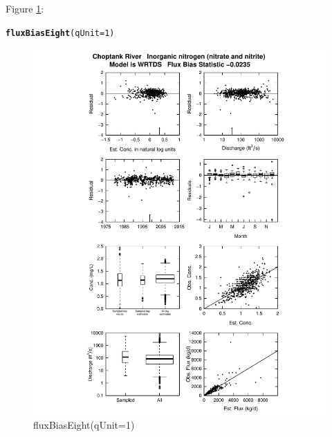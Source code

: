 \documentclass[a4paper,11pt]{article}\usepackage{graphicx, color}
\makeatletter
\def\maxwidth{ %
  \ifdim\Gin@nat@width>\linewidth
    \linewidth
  \else
    \Gin@nat@width
  \fi
}
\newcommand{\hlfunctioncall}[1]{\textcolor[rgb]{0.501960784313725,0,0.329411764705882}{\textbf{#1}}}%
\newenvironment{kframe}{%
 \def\at@end@of@kframe{}%
 \ifinner\ifhmode%
  \def\at@end@of@kframe{\end{minipage}}%
  \begin{minipage}{\columnwidth}%
 \fi\fi%
 \def\FrameCommand##1{\hskip\@totalleftmargin \hskip-\fboxsep
 \colorbox{shadecolor}{##1}\hskip-\fboxsep
     \hskip-\linewidth \hskip-\@totalleftmargin \hskip\columnwidth}%
 \MakeFramed {\advance\hsize-\width
   \@totalleftmargin\z@ \linewidth\hsize
   \@setminipage}}%
 {\par\unskip\endMakeFramed%
 \at@end@of@kframe}
\newenvironment{knitrout}{}{} %
\makeatother
\begin{document}
Figure \ref{fig:fluxBiasEight}:
\begin{knitrout}
\color{fgcolor}\begin{kframe}
\begin{alltt}
\hlfunctioncall{fluxBiasEight}(qUnit=1)
\end{alltt}
\end{kframe}\begin{figure}[]

\includegraphics[width=\maxwidth]{figure/fluxBiasEight} \caption[fluxBiasEight(qUnit=1)]{fluxBiasEight(qUnit=1)\label{fig:fluxBiasEight}}
\end{figure}


\end{knitrout}
\end{document}
